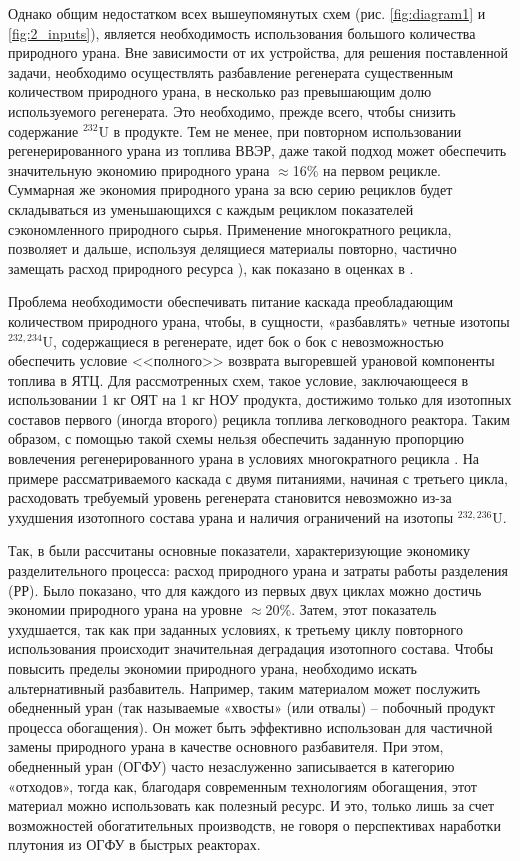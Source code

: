 Однако общим недостатком всех вышеупомянутых схем (рис. \ref{fig:diagram1} и \ref{fig:2_inputs}), является необходимость использования большого количества природного урана.
Вне зависимости от их устройства, для решения поставленной задачи, необходимо осуществлять разбавление регенерата существенным количеством природного урана, в несколько раз превышающим долю используемого регенерата. Это необходимо, прежде всего, чтобы снизить содержание $^{232}$U в продукте.
Тем не менее, при повторном использовании регенерированного урана из топлива ВВЭР, даже такой подход может обеспечить значительную экономию природного урана $\approx$16\% на первом рецикле.
Суммарная же экономия природного урана за всю серию рециклов будет складываться из уменьшающихся с каждым рециклом показателей сэкономленного природного сырья. Применение многократного рецикла, позволяет и дальше, используя делящиеся материалы повторно, частично замещать расход природного ресурса \cite{colemanEvaluationMultipleSelfrecycling2010}), как показано в оценках в \cite{smirnovEvolutionIsotopicComposition2012}.

Проблема необходимости обеспечивать питание каскада преобладающим количеством природного урана, чтобы, в сущности, «разбавлять» четные изотопы  $^{232,234}$U, содержащиеся в регенерате, идет бок о бок с невозможностью обеспечить условие <<полного>> возврата выгоревшей урановой компоненты топлива в ЯТЦ.
Для рассмотренных схем, такое условие, заключающееся в использовании 1 кг ОЯТ на 1 кг НОУ продукта, достижимо только для изотопных составов первого (иногда второго) рецикла топлива легководного реактора.
Таким образом, с помощью такой схемы нельзя обеспечить заданную пропорцию вовлечения регенерированного урана в условиях многократного рецикла \cite{smirnovApplyingEnrichmentCapacities2018}.
На примере рассматриваемого каскада с двумя питаниями, начиная с третьего цикла, расходовать требуемый уровень регенерата становится невозможно из-за ухудшения изотопного состава урана и наличия ограничений на изотопы $^{232,236}$U.

Так, в \cite{smirnovApplyingEnrichmentCapacities2018} были рассчитаны основные показатели, характеризующие экономику разделительного процесса: расход природного урана и затраты работы разделения (РР).
Было показано, что для каждого из первых двух циклах можно достичь экономии природного урана на уровне $\approx$20\%. Затем, этот показатель ухудшается, так как при заданных условиях, к третьему циклу повторного использования происходит значительная деградация изотопного состава.
Чтобы повысить пределы экономии природного урана, необходимо искать альтернативный разбавитель. Например, таким материалом может послужить обедненный уран (так называемые «хвосты» (или отвалы) -- побочный продукт процесса обогащения).
Он может быть эффективно использован для частичной замены природного урана в качестве основного разбавителя.
При этом, обедненный уран (ОГФУ) часто незаслуженно записывается в категорию «отходов», тогда как, благодаря современным технологиям обогащения, этот материал можно использовать как полезный ресурс.
И это, только лишь за счет возможностей обогатительных производств, не говоря о перспективах наработки плутония из ОГФУ в быстрых реакторах.

